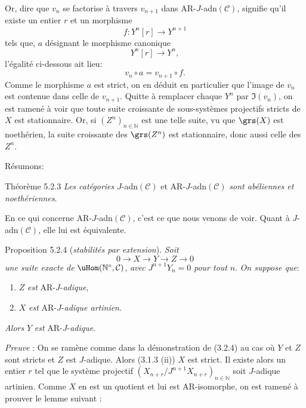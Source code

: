 Or, dire que \(v_n\) se factorise à travers \(v_{n+1}\) dans AR-\(J\)-adn\((\mathcal{C})\), signifie qu'il existe un entier \(r\) et un morphisme
\[
f:Y^n[r]\longrightarrow Y^{n+1}
\]
tels que, \(a\) désignant le morphisme canonique
\[
Y^n[r]\longrightarrow Y^n,
\]
l'égalité ci-dessous ait lieu:
\[
v_n\circ a=v_{n+1}\circ f .
\]
Comme le morphisme \(a\) est strict, on en déduit en particulier que l'image de \(v_n\) est contenue dans celle de \(v_{n+1}\). Quitte à remplacer chaque \(Y^n\) par \(\Im(v_n)\), on est ramené à voir que toute suite croissante de sous-systèmes projectifs stricts de \(X\) est stationnaire. Or, si \((Z^n)_{n\in\mathbb{N}}\) est une telle suite, vu que \(\grs(X)\) est noethérien, la suite croissante des \(\grs(Z^n)\) est stationnaire, donc aussi celle des \(Z^n\).

Résumons:

\begin{statement}{Théorème 5.2.3}
\emph{Les catégories} \(J\)-adn\((\mathcal{C})\) et AR-\(J\)-adn\((\mathcal{C})\) \emph{sont abéliennes et noethériennes}.
\end{statement}

En ce qui concerne AR-\(J\)-adn\((\mathcal{C})\), c'est ce que nous venons de voir. Quant à \(J\)-adn\((\mathcal{C})\), elle lui est équivalente.

\begin{statement}{Proposition 5.2.4}
(\emph{stabilités par extension}). \emph{Soit}
\[
0\longrightarrow X\longrightarrow Y\longrightarrow Z\longrightarrow0
\]
\emph{une suite exacte de} \(\uHom(\mathbb{N}^\circ,\mathcal{C})\), \emph{avec} \(J^{n+1}Y_n=0\) \emph{pour tout} \(n\). \emph{On suppose que}:
\begin{enumerate}[label=\textup{(\roman*)}]
\item \(Z\) \emph{est} AR-\(J\)-\emph{adique},
\item \(X\) \emph{est} AR-\(J\)-\emph{adique artinien}.
\end{enumerate}
\emph{Alors} \(Y\) \emph{est} AR-\(J\)-\emph{adique}.
\end{statement}

\emph{Preuve} : On se ramène comme dans la démonstration de (3.2.4) au cas où \(Y\) et \(Z\) sont stricts et \(Z\) est \(J\)-adique. Alors (3.1.3 (ii)) \(X\) est strict. Il existe alors un entier \(r\) tel que le système projectif \((X_{n+r}/J^{n+1}X_{n+r})_{n\in\mathbb{N}}\) soit \(J\)-adique artinien. Comme \(X\) en est un quotient et lui est AR-isomorphe, on est ramené à prouver le lemme suivant :


